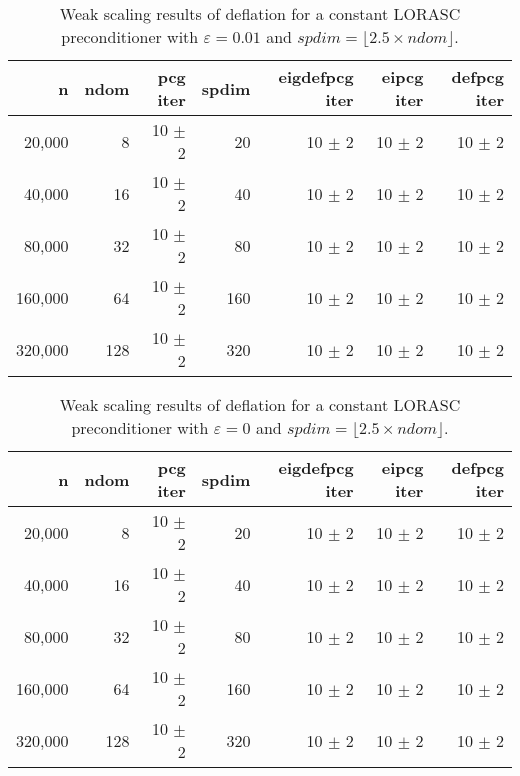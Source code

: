 \documentclass{article}
\begin{document}
\begin{table}[ht]
\caption{Weak scaling results of deflation for a constant LORASC preconditioner with $\varepsilon=0.01$ and $spdim=\lfloor 2.5 \times ndom\rfloor$.}
\centering
\begin{tabular}{|r|r|r|r|r|r|r|}
	\hline
	n & ndom & pcg iter & spdim & eigdefpcg iter & eipcg iter & defpcg iter\\
	\hline
	20,000  &   8 & 10 $\pm$ 2 & 20 & 10 $\pm$ 2 & 10 $\pm$ 2 & 10 $\pm$ 2 \\
	40,000  &  16 & 10 $\pm$ 2 & 40 & 10 $\pm$ 2 & 10 $\pm$ 2 & 10 $\pm$ 2 \\
	80,000  &  32 & 10 $\pm$ 2 & 80 & 10 $\pm$ 2 & 10 $\pm$ 2 & 10 $\pm$ 2 \\
	160,000 &  64 & 10 $\pm$ 2 & 160 & 10 $\pm$ 2 & 10 $\pm$ 2 & 10 $\pm$ 2 \\
	320,000 & 128 & 10 $\pm$ 2 & 320 & 10 $\pm$ 2 & 10 $\pm$ 2 & 10 $\pm$ 2 \\
	\hline
\end{tabular}
\label{Tab:010}
\end{table}

\begin{table}[ht]
	\caption{Weak scaling results of deflation for a constant LORASC preconditioner with $\varepsilon=0$ and $spdim=\lfloor 2.5 \times ndom\rfloor$.}
	\centering
	\begin{tabular}{|r|r|r|r|r|r|r|}
		\hline
		n & ndom & pcg iter & spdim & eigdefpcg iter & eipcg iter & defpcg iter\\
		\hline
		20,000  &   8 & 10 $\pm$ 2 & 20 & 10 $\pm$ 2 & 10 $\pm$ 2 & 10 $\pm$ 2 \\
		40,000  &  16 & 10 $\pm$ 2 & 40 & 10 $\pm$ 2 & 10 $\pm$ 2 & 10 $\pm$ 2 \\
		80,000  &  32 & 10 $\pm$ 2 & 80 & 10 $\pm$ 2 & 10 $\pm$ 2 & 10 $\pm$ 2 \\
		160,000 &  64 & 10 $\pm$ 2 & 160 & 10 $\pm$ 2 & 10 $\pm$ 2 & 10 $\pm$ 2 \\
		320,000 & 128 & 10 $\pm$ 2 & 320 & 10 $\pm$ 2 & 10 $\pm$ 2 & 10 $\pm$ 2 \\
		\hline
	\end{tabular}
	\label{Tab:015}
\end{table}
\end{document}
